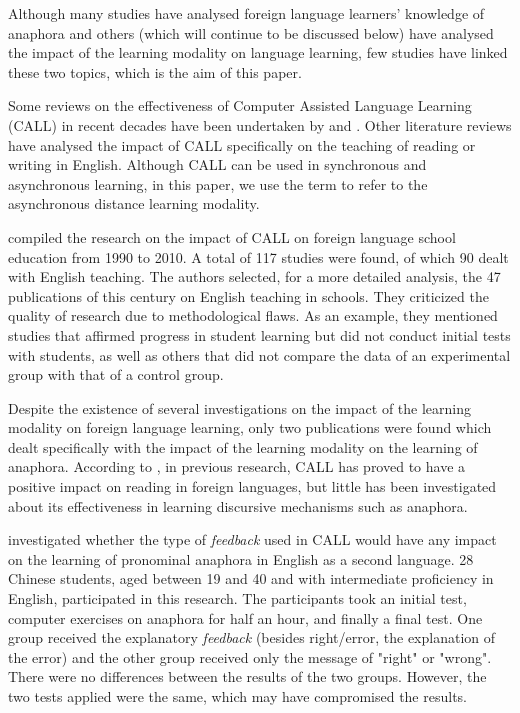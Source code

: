 \documentclass{textolivre}
\begin{document}
Although many studies have analysed foreign language learners' knowledge
of anaphora and others (which will continue to be discussed below) have
analysed the impact of the learning modality on language learning, few
studies have linked these two topics, which is the aim of this paper.

Some reviews on the effectiveness of Computer Assisted Language Learning
(CALL) in recent decades have been undertaken by \textcite{stockwell_review_2007}  %
and \textcite{liu_look_2002}. Other literature reviews have
analysed the impact of CALL specifically on the teaching of reading
\cite{kim_use_2002} or writing \cite{yang_review_2012} in English. Although
CALL can be used in synchronous and asynchronous learning, in this
paper, we use the term to refer to the asynchronous distance learning
modality.

\textcite{macaro_systematic_2012} compiled the research on the impact
of CALL on foreign language school education from 1990 to 2010. A total
of 117 studies were found, of which 90 dealt with English teaching. The
authors selected, for a more detailed analysis, the 47 publications of
this century on English teaching in schools. They criticized the quality
of research due to methodological flaws. As an example, they mentioned
studies that affirmed progress in student learning but did not conduct
initial tests with students, as well as others that did not compare the
data of an experimental group with that of a control group.

Despite the existence of several investigations on the impact of the
learning modality on foreign language learning, only two publications
were found which dealt specifically with the impact of the learning
modality on the learning of anaphora. According to \textcite[p. 72]{li_engaging_2014}, in
previous research, CALL has proved to have a positive impact on reading
in foreign languages, but little has been investigated about its
effectiveness in learning discursive mechanisms such as anaphora.

\textcite{liu_acquisition_2010} investigated whether the type of \emph{feedback} used in CALL
would have any impact on the learning of pronominal anaphora in English
as a second language. 28 Chinese students, aged between 19 and 40 and
with intermediate proficiency in English, participated in this research.
The participants took an initial test, computer exercises on anaphora
for half an hour, and finally a final test. One group received the
explanatory \emph{feedback} (besides right/error, the explanation of the
error) and the other group received only the message of "right" or
"wrong". There were no differences between the results of the two
groups. However, the two tests applied were the same, which may have
compromised the results.
\end{document}
